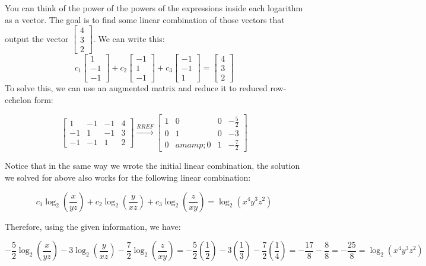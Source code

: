 \begin{enumerate}
You can think of the power of the powers of the expressions inside each logarithm as a vector. The goal is to find some linear combination of those vectors that output the vector $\begin{bmatrix} 4 \\ 3 \\ 2 \end{bmatrix}$. We can write this:
 \[c_1 \begin{bmatrix} 1 \\ -1 \\ -1 \end{bmatrix} + c_2 \begin{bmatrix} -1 \\ 1 \\ -1 \end{bmatrix} + c_3 \begin{bmatrix} -1 \\ -1 \\ 1 \end{bmatrix} = \begin{bmatrix} 4 \\ 3 \\ 2 \end{bmatrix}\]To solve this, we can use an augmented matrix and reduce it to reduced row-echelon form:

 
 \[\begin{bmatrix} 1 & -1 & -1 & 4 \\ -1 & 1 & - 1 & 3 \\ -1 & -1 & 1 & 2 \end{bmatrix} \xrightarrow{RREF} \begin{bmatrix} 1 & 0 & 0 & -\frac{5}{2} \\ 0 & 1 & 0 & -3 \\ 0 &amamp; 0 & 1 & -\frac{7}{2} \end{bmatrix}\]

 Notice that in the same way we wrote the initial linear combination, the solution we solved for above also works for the following linear combination:

 
 \[c_1 \log_2{\left(\frac{x}{yz}\right)} + c_2 \log_2{\left( \frac{y}{xz} \right)} + c_3 \log_2{\left(\frac{z}{xy}\right)} = \log_2{\left(x^4y^3z^2\right)}\]

 Therefore, using the given information, we have:

 
 \[-\frac{5}{2} \log_2{\left(\frac{x}{yz}\right)} - 3 \log_2{\left( \frac{y}{xz} \right)} - \frac{7}{2} \log_2{\left(\frac{z}{xy}\right)} = -\frac{5}{2} \left(\frac{1}{2}\right) - 3 \left(\frac{1}{3}\right) - \frac{7}{2} \left( \frac{1}{4} \right) = -\frac{17}{8} - \frac{8}{8} = -\frac{25}{8} = \log_2{\left(x^4y^3z^2\right)}\]


\end{enumerate}
